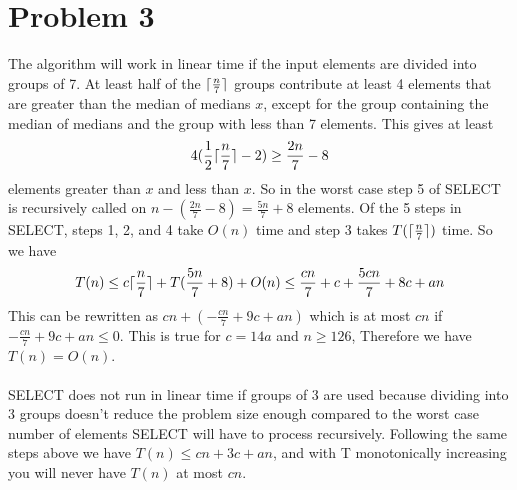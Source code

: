 \documentclass{article}
\DeclarePairedDelimiter{\ceil}{\lceil}{\rceil}
\begin{document}
\section*{Problem 3}
The algorithm will work in linear time if the input elements are divided into groups of 7.  At least half of the $\ceil{\frac{n}{7}}$ groups contribute at least 4 elements that are greater than the median of medians $x$, except for the group containing the median of medians and the group with less than 7 elements.  This gives at least $$4(\frac{1}{2}\ceil{\frac{n}{7}} -2) \geq \frac{2n}{7} -8$$ elements greater than $x$ and less than $x$. So in the worst case step 5 of SELECT is recursively called on $n-(\frac{2n}{7}-8)=\frac{5n}{7}+8$ elements. Of the 5 steps in SELECT, steps 1, 2, and 4 take $O(n)$ time and step 3 takes $T(\ceil{\frac{n}{7}})$ time. So we have $$T(n) \leq c\ceil{\frac{n}{7}}+T(\frac{5n}{7}+8)+O(n) \leq \frac{cn}{7}+c+\frac{5cn}{7}+8c+an$$ This can be rewritten as $cn+(-\frac{cn}{7}+9c+an)$ which is at most $cn$ if $-\frac{cn}{7}+9c+an \leq 0$.  This is true for $c=14a$ and $n\geq126$, Therefore we have $T(n)=O(n)$.\\\\
SELECT does not run in linear time if groups of 3 are used because dividing into 3 groups doesn't reduce the problem size enough compared to the worst case number of elements SELECT will have to process recursively.  Following the same steps above we have $T(n) \leq cn +3c +an$, and with T monotonically increasing you will never have $T(n)$ at most $cn$.
\end{document}
